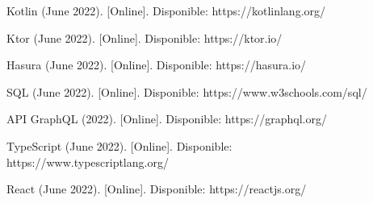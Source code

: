 \documentclass[a4paper]{IEEEtran}
\begin{document}
\begin{thebibliography}{00}
 Kotlin (June 2022). [Online]. Disponible: https://kotlinlang.org/

 Ktor (June 2022). [Online]. Disponible: https://ktor.io/ 

 Hasura (June 2022). [Online]. Disponible: https://hasura.io/

 SQL (June 2022). [Online]. Disponible: https://www.w3schools.com/sql/

 API GraphQL (2022). [Online]. Disponible: https://graphql.org/

 TypeScript (June 2022). [Online]. Disponible: \\ https://www.typescriptlang.org/

 React (June 2022). [Online]. Disponible: https://reactjs.org/


\end{thebibliography}
\end{document}

